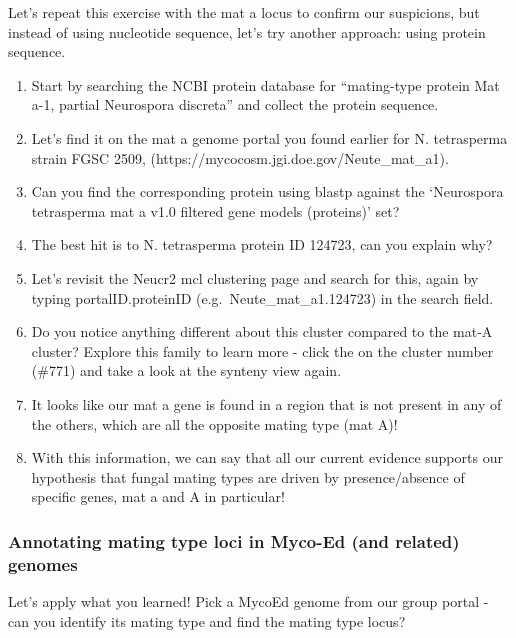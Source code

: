 \documentclass[
  letterpaper,
  DIV=11,
  numbers=noendperiod]{scrreprt}
\providecommand{\tightlist}{%
  \setlength{\itemsep}{0pt}\setlength{\parskip}{0pt}}
\begin{document}
Let's repeat this exercise with the mat a locus to confirm our
suspicions, but instead of using nucleotide sequence, let's try another
approach: using protein sequence.

\begin{enumerate}
\def\labelenumi{\arabic{enumi}.}
\tightlist
\item
  Start by searching the NCBI protein database for ``mating-type protein
  Mat a-1, partial Neurospora discreta'' and collect the protein
  sequence.
\item
  Let's find it on the mat a genome portal you found earlier for N.
  tetrasperma strain FGSC 2509,
  (https://mycocosm.jgi.doe.gov/Neute\_mat\_a1).
\item
  Can you find the corresponding protein using blastp against the
  `Neurospora tetrasperma mat a v1.0 filtered gene models (proteins)'
  set?
\item
  The best hit is to N. tetrasperma protein ID 124723, can you explain
  why?
\item
  Let's revisit the Neucr2 mcl clustering page and search for this,
  again by typing portalID.proteinID (e.g.~Neute\_mat\_a1.124723) in the
  search field.
\item
  Do you notice anything different about this cluster compared to the
  mat-A cluster? Explore this family to learn more - click the on the
  cluster number (\#771) and take a look at the synteny view again.
\item
  It looks like our mat a gene is found in a region that is not present
  in any of the others, which are all the opposite mating type (mat A)!
\item
  With this information, we can say that all our current evidence
  supports our hypothesis that fungal mating types are driven by
  presence/absence of specific genes, mat a and A in particular!
\end{enumerate}

\subsubsection*{Annotating mating type loci in Myco-Ed (and related)
genomes}\label{annotating-mating-type-loci-in-myco-ed-and-related-genomes}

Let's apply what you learned! Pick a MycoEd genome from our group portal
- can you identify its mating type and find the mating type locus?
\end{document}
